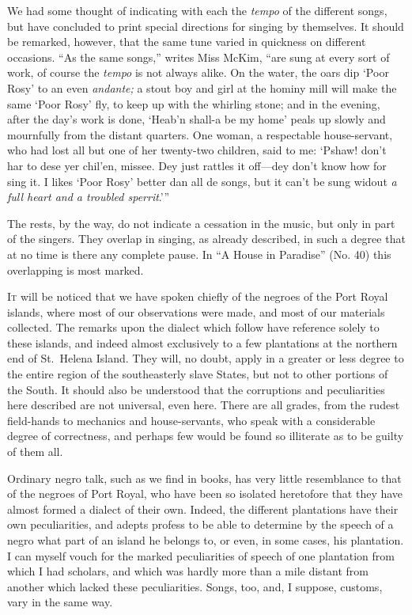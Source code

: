 \documentclass[a5paper,10pt]{book}
\begin{document}
We had some thought of indicating with each the \emph{tempo} of the
different songs, but have concluded to print special directions for
singing by themselves.  It should be remarked, however, that the same
tune varied in quickness on different occasions.  ``As the same
songs,'' writes Miss McKim, ``are sung at every sort of work, of
course the \emph{tempo} is not always alike.  On the water, the oars
dip `Poor Rosy' to an even \emph{andante;} a stout boy and girl at the
hominy mill will make the same `Poor Rosy' fly, to keep up with the
whirling stone; and in the evening, after the day's work is done,
`Heab'n shall-a be my home' peals up slowly and mournfully from the
distant quarters.  One woman, a respectable house-servant, who had
lost all but one of her twenty-two children, said to me: `Pshaw! don't
har to dese yer chil'en, missee.  Dey just rattles it off---dey don't
know how for sing it.  I likes `Poor Rosy' better dan all de songs,
but it can't be sung widout \emph{a full heart and a troubled
sperrit}.'{}''

The rests, by the way, do not indicate a cessation in the music, but
only in part of the singers.  They overlap in singing, as already
described, in such a degree that at no time is there any complete
pause.  In ``A House in Paradise'' (No. 40) this overlapping is most
marked.

\bigskip

\textsc{It} will be noticed that we have spoken chiefly of the negroes
of the Port Royal islands, where most of our observations were made,
and most of our materials collected.  The remarks upon the dialect
which follow have reference solely to these islands, and indeed almost
exclusively to a few plantations at the northern end of St.~Helena
Island.  They will, no doubt, apply in a greater or less degree to the
entire region of the southeasterly slave States, but not to other
portions of the South.  It should also be understood that the
corruptions and peculiarities here described are not universal, even
here.  There are all grades, from the rudest field-hands to mechanics
and house-servants, who speak with a considerable degree of
correctness, and perhaps few would be found so illiterate as to be
guilty of them all.

Ordinary negro talk, such as we find in books, has very little
resemblance to that of the negroes of Port Royal, who have been so
isolated heretofore that they have almost formed a dialect of their
own.  Indeed, the different plantations have their own peculiarities,
and adepts profess to be able to determine by the speech of a negro
what part of an island he belongs to, or even, in some cases, his
plantation.  I can myself vouch for the marked peculiarities of speech
of one plantation from which I had scholars, and which was hardly more
than a mile distant from another which lacked these peculiarities.
Songs, too, and, I suppose, customs, vary in the same way.
\end{document}
